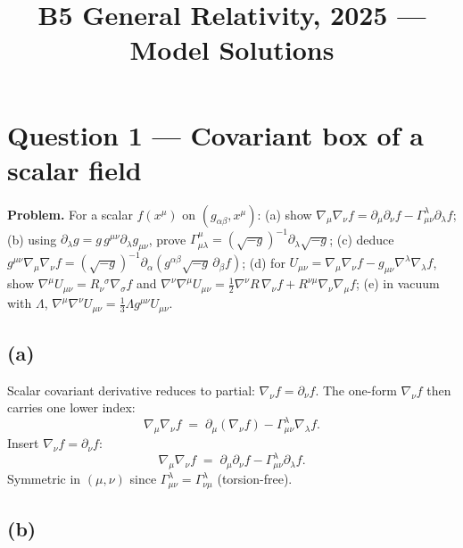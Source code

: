 \documentclass[11pt]{article}
\title{B5 General Relativity, 2025 --- Model Solutions}
\author{}
\date{}
\begin{document}
\maketitle

\section*{Question 1 --- Covariant box of a scalar field}

\textbf{Problem.} For a scalar $f(x^\mu)$ on $(g_{\alpha\beta},x^\mu)$: (a) show $\nabla_\mu\nabla_\nu f=\partial_\mu\partial_\nu f-\Gamma^\lambda_{\mu\nu}\partial_\lambda f$; (b) using $\partial_\lambda g=g\,g^{\mu\nu}\partial_\lambda g_{\mu\nu}$, prove $\Gamma^\mu_{\mu\lambda}=(\sqrt{-g})^{-1}\partial_\lambda\sqrt{-g}$; (c) deduce $g^{\mu\nu}\nabla_\mu\nabla_\nu f=(\sqrt{-g})^{-1}\partial_\alpha(g^{\alpha\beta}\sqrt{-g}\,\partial_\beta f)$; (d) for $U_{\mu\nu}=\nabla_\mu\nabla_\nu f-g_{\mu\nu}\nabla^\lambda\nabla_\lambda f$, show $\nabla^\mu U_{\mu\nu}=R_\nu{}^\sigma\nabla_\sigma f$ and $\nabla^\nu\nabla^\mu U_{\mu\nu}=\tfrac12\nabla^\nu R\,\nabla_\nu f+R^{\nu\mu}\nabla_\nu\nabla_\mu f$; (e) in vacuum with $\Lambda$, $\nabla^\mu\nabla^\nu U_{\mu\nu}=\tfrac13\Lambda g^{\mu\nu}U_{\mu\nu}$.

\subsection*{(a)}

Scalar covariant derivative reduces to partial: $\nabla_\nu f=\partial_\nu f$. The one-form $\nabla_\nu f$ then carries one lower index:
\[
\nabla_\mu\nabla_\nu f \;=\; \partial_\mu(\nabla_\nu f) - \Gamma^\lambda_{\mu\nu}\nabla_\lambda f.
\]
Insert $\nabla_\nu f=\partial_\nu f$:
\begin{equation}
\boxed{\;\nabla_\mu\nabla_\nu f \;=\; \partial_\mu\partial_\nu f - \Gamma^\lambda_{\mu\nu}\partial_\lambda f.\;}
\label{eq:Q1a}
\end{equation}
Symmetric in $(\mu,\nu)$ since $\Gamma^\lambda_{\mu\nu}=\Gamma^\lambda_{\nu\mu}$ (torsion-free).

\subsection*{(b)}
\end{document}
